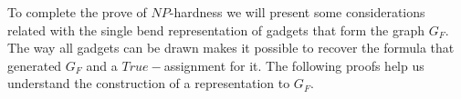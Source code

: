 \documentclass[9pt]{entcs}
\begin{document}

% 


% 





To complete the prove of $NP$-hardness we will  present some considerations related with the single bend representation of gadgets that form the graph $G_F$. The way all gadgets can be drawn makes it possible to recover the formula that generated $G_F$ and a $True-$assignment for it. The following proofs help us understand the construction of a representation to $G_F$.  
\end{document}
